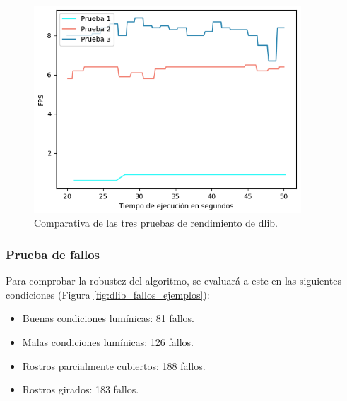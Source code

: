 \begin{figure} [h!]
  \begin{center}
    \includegraphics[width=10cm]{figs/dlib_rendimiento.png}
  \end{center}
  \captionsetup{justification=centering}
  \caption{Comparativa de las tres pruebas de rendimiento de dlib.}
  \label{fig:dlib_rendimiento}
\end{figure}

\subsubsection{Prueba de fallos}

Para comprobar la robustez del algoritmo, se evaluará a este en las siguientes condiciones (Figura \ref{fig:dlib_fallos_ejemplos}):

\begin{itemize}
    \item Buenas condiciones lumínicas: 81 fallos.
    \item Malas condiciones lumínicas: 126 fallos.
    \item Rostros parcialmente cubiertos: 188 fallos.
    \item Rostros girados: 183 fallos.
\end{itemize}

